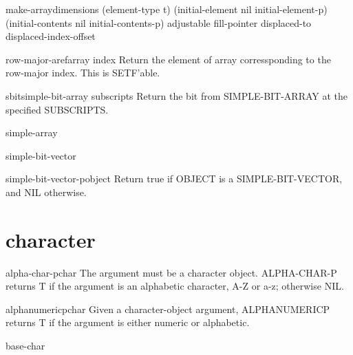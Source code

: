 \begin{function}{make-array}{dimensions \key (element-type t) (initial-element nil initial-element-p)
 (initial-contents nil initial-contents-p) adjustable fill-pointer displaced-to
 displaced-index-offset}{}
  
\end{function}

\begin{accessor}{row-major-aref}{array index}{}
  Return the element of array corressponding to the row-major index. This is
   SETF'able.
\end{accessor}

\begin{accessor}{sbit}{simple-bit-array \rest subscripts}{}
  Return the bit from SIMPLE-BIT-ARRAY at the specified SUBSCRIPTS.
\end{accessor}

\begin{type}{simple-array}{}{}
  
\end{type}

\begin{type}{simple-bit-vector}{}{}
  
\end{type}

\begin{function}{simple-bit-vector-p}{object}{}
  Return true if OBJECT is a SIMPLE-BIT-VECTOR, and NIL otherwise.
\end{function}

\section{character}

\begin{function}{alpha-char-p}{char}{}
  The argument must be a character object. ALPHA-CHAR-P returns T if the
   argument is an alphabetic character, A-Z or a-z; otherwise NIL.
\end{function}

\begin{function}{alphanumericp}{char}{}
  Given a character-object argument, ALPHANUMERICP returns T if the
   argument is either numeric or alphabetic.
\end{function}

\begin{type}{base-char}{}{}
  
\end{type}


